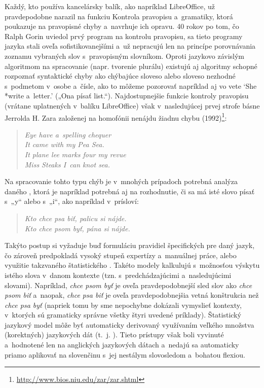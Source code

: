 Každý, kto používa kancelársky balík, ako napríklad LibreOffice, už pravdepodobne narazil na funkciu Kontrola pravopisu a~gramatiky, ktorá poukazuje na pravopisné chyby a~navrhuje ich opravu. 40 rokov po tom, čo Ralph Gorin uviedol prvý program na kontrolu pravopisu, sa tieto programy jazyka stali oveľa sofistikovanejšími a~už nepracujú len na princípe porovnávania zoznamu vybraných slov s~pravopisným slovníkom. Oproti jazykovo závislým algoritmom na spracovanie  (napr. tvorenie plurálu) existujú aj algoritmy schopné rozpoznať syntaktické chyby ako chýbajúce sloveso alebo sloveso nezhodné s~podmetom v~osobe a~čísle, ako to môžeme pozorovať napríklad aj vo vete ‘She *write a~letter.’ („Ona písať list.“). Najdostupnejšie funkcie kontroly pravopisu (vrátane uplatnených v~balíku LibreOffice) však v~nasledujúcej prvej strofe básne Jerrolda H. Zara založenej na homofónii nenájdu žiadnu chybu (1992)\footnote{\url{http://www.bios.niu.edu/zar/zar.shtml}}:

\begin{verse}
\emph{%
Eye have a~spelling chequer\\
It came with my Pea Sea.\\
It plane lee marks four my revue\\
Miss Steaks I~can knot sea.
}
\end{verse}

Na spracovanie tohto typu chýb je v~mnohých prípadoch potrebná analýza daného , ktorá je napríklad potrebná aj na rozhodnutie, či sa má isté slovo písať s~„y“ alebo s~„i“, ako napríklad v~prísloví:

\begin{verse}
\emph{%
Kto chce psa biť, palicu si nájde.\\
\smallskip
Kto chce psom byť, pána si nájde.
}
\end{verse}

Takýto postup si vyžaduje buď formuláciu  pravidiel špecifických pre daný jazyk, čo zároveň predpokladá vysoký stupeň expertízy a~manuálnej práce, alebo využitie takzvaného štatistického . Takéto modely kalkulujú s~možnosťou výskytu istého slova v~danom kontexte (tzn. s~predchádzajúcimi a~nasledujúcimi slovami). Napríklad, \emph{chce psom byť} je oveľa pravdepodobnejší sled slov ako \emph{chce psom biť} a~naopak, \emph{chce psa biť} je oveľa pravdepodobnejšia vetná konštrukcia než \emph{chce psa byť} (napriek tomu by sme nepochybne dokázali vymyslieť kontexty, v~ktorých sú gramaticky správne všetky štyri uvedené príklady). Štatistický jazykový model môže byť automaticky derivovaný využívaním veľkého množstva (korektných) jazykových dát (t.~j. ). Tieto prístupy však boli vyvinuté a~hodnotené len na anglických jazykových dátach a~nedajú sa automaticky priamo aplikovať na slovenčinu s~jej nestálym slovosledom a~bohatou flexiou.

